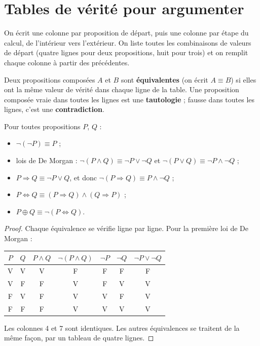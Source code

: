 \section{Tables de vérité pour argumenter}
\begin{method}
On écrit une colonne par proposition de départ, puis une colonne par étape du calcul, de l'intérieur vers l'extérieur. On liste toutes les combinaisons de valeurs de départ (quatre lignes pour deux propositions, huit pour trois) et on remplit chaque colonne à partir des précédentes.
\end{method}
\begin{definition}
Deux propositions composées $A$ et $B$ sont \textbf{équivalentes} (on écrit $A\equiv B$) si elles ont la même valeur de vérité dans chaque ligne de la table. Une proposition composée vraie dans toutes les lignes est une \textbf{tautologie} ; fausse dans toutes les lignes, c'est une \textbf{contradiction}.
\end{definition}
\begin{theorem}
Pour toutes propositions $P$, $Q$ :
\begin{itemize}
\item $\lnot(\lnot P)\equiv P$ ;
\item lois de De Morgan : $\lnot(P\land Q)\equiv\lnot P\lor\lnot Q$ et $\lnot(P\lor Q)\equiv\lnot P\land\lnot Q$ ;
\item $P\Rightarrow Q\equiv\lnot P\lor Q$, et donc $\lnot(P\Rightarrow Q)\equiv P\land\lnot Q$ ;
\item $P\Leftrightarrow Q\equiv(P\Rightarrow Q)\land(Q\Rightarrow P)$ ;
\item $P\oplus Q\equiv\lnot(P\Leftrightarrow Q)$.
\end{itemize}
\end{theorem}
\begin{proof}
Chaque équivalence se vérifie ligne par ligne. Pour la première loi de De Morgan :
\begin{center}
\begin{tabular}{c|c||c|c|c|c|c}
$P$ & $Q$ & $P\land Q$ & $\lnot(P\land Q)$ & $\lnot P$ & $\lnot Q$ & $\lnot P\lor\lnot Q$\\\hline
V & V & V & F & F & F & F\\
V & F & F & V & F & V & V\\
F & V & F & V & V & F & V\\
F & F & F & V & V & V & V
\end{tabular}
\end{center}
Les colonnes 4 et 7 sont identiques. Les autres équivalences se traitent de la même façon, par un tableau de quatre lignes.
\end{proof}
